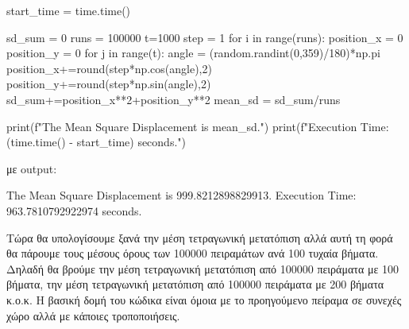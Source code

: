 \en
\begin{python}
start_time = time.time()

sd_sum = 0
runs = 100000
t=1000
step = 1
for i in range(runs):
    position_x = 0
    position_y = 0
    for j in range(t):
        angle = (random.randint(0,359)/180)*np.pi
        position_x+=round(step*np.cos(angle),2)
        position_y+=round(step*np.sin(angle),2)
    sd_sum+=position_x**2+position_y**2
mean_sd = sd_sum/runs

print(f"The Mean Square Displacement is {mean_sd}.")
print(f"Execution Time: {(time.time() - start_time)} seconds.")
\end{python}
\gr με \en output:
\begin{python}
The Mean Square Displacement is 999.8212898829913.
Execution Time: 963.7810792922974 seconds.
\end{python}
\gr 

Τώρα θα υπολογίσουμε ξανά την μέση τετραγωνική μετατόπιση αλλά αυτή τη φορά θα πάρουμε τους μέσους όρους των 100000 πειραμάτων ανά 100 τυχαία βήματα. Δηλαδή θα βρούμε την μέση τετραγωνική μετατόπιση από 100000 πειράματα με 100 βήματα, την μέση τετραγωνική μετατόπιση από 100000 πειράματα με 200 βήματα κ.ο.κ. Η βασική δομή του κώδικα είναι όμοια με το προηγούμενο πείραμα σε συνεχές χώρο αλλά με κάποιες τροποποιήσεις.

